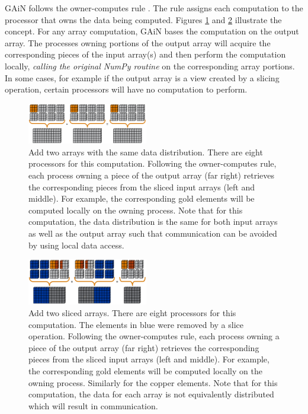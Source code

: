 \documentclass{sigplanconf}
\begin{document}
GAiN follows the owner-computes rule \cite{Zim88}. The rule assigns each
computation to the processor that owns the data being computed. Figures
\ref{fig:2} and \ref{fig:3} illustrate the concept. For any array computation,
GAiN bases the computation on the output array. The processes owning portions
of the output array will acquire the corresponding pieces of the input
array(s) and then perform the computation locally, \emph{calling the original
NumPy routine} on the corresponding array portions. In some cases, for example
if the output array is a view created by a slicing operation, certain
processors will have no computation to perform.

\begin{figure}[htb]
\centering
\includegraphics[width=0.47\textwidth]{image3_crop.eps}
\caption{
Add two arrays with the same data distribution. There are eight processors for
this computation.  Following the owner-computes rule, each process owning a
piece of the output array (far right) retrieves the corresponding pieces from
the sliced input arrays (left and middle). For example, the corresponding gold
elements will be computed locally on the owning process.  Note that for this
computation, the data distribution is the same for both input arrays as well
as the output array such that communication can be avoided by using local data
access.
}
\label{fig:2}
\end{figure}

\begin{figure}[htb]
\centering
\includegraphics[width=0.47\textwidth]{image2_crop.eps}
\caption{
Add two sliced arrays. There are eight processors for this computation.  The
elements in blue were removed by a slice operation. Following the
owner-computes rule, each process owning a piece of the output array (far
right) retrieves the corresponding pieces from the sliced input arrays (left
and middle). For example, the corresponding gold elements will be computed
locally on the owning process. Similarly for the copper elements.  Note that
for this computation, the data for each array is not equivalently distributed
which will result in communication.
}
\label{fig:3}
\end{figure}
\end{document}
